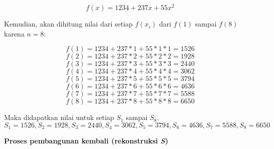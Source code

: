 \begin{displaymath}
	f(x) = 1234 + 237x + 55x^2
\end{displaymath}

Kemudian, akan dihitung nilai dari setiap \begin{math}f(x_i)\end{math} dari \begin{math}f(1)\end{math} sampai \begin{math}f(8)\end{math} karena \begin{math}n=8\end{math}:

\begin{displaymath}
	f(1) = 1234 + 237*1 + 55*1*1 = 1526
\end{displaymath}
\begin{displaymath}
	f(2) = 1234 + 237*2 + 55*2*2 = 1928
\end{displaymath}
\begin{displaymath}
	f(3) = 1234 + 237*3 + 55*3*3 = 2440
\end{displaymath}
\begin{displaymath}
	f(4) = 1234 + 237*4 + 55*4*4 = 3062
\end{displaymath}
\begin{displaymath}
	f(5) = 1234 + 237*5 + 55*5*5 = 3794
\end{displaymath}
\begin{displaymath}
	f(6) = 1234 + 237*6 + 55*6*6 = 4636
\end{displaymath}
\begin{displaymath}
	f(7) = 1234 + 237*7 + 55*7*7 = 5588
\end{displaymath}
\begin{displaymath}
	f(8) = 1234 + 237*8 + 55*8*8 = 6650
\end{displaymath}

Maka didapatkan nilai untuk setiap \begin{math}S_1\end{math} sampai \begin{math}S_8\end{math}.
\begin{displaymath}
	S_1 = 1526, S_2 = 1928, S_3 = 2440, S_4 = 3062, S_5 = 3794, S_6 = 4636, S_7 = 5588, S_8 = 6650
\end{displaymath}

\begin{flushleft}
	\textbf{Proses pembangunan kembali (rekonstruksi \textit{S})}
\end{flushleft}

